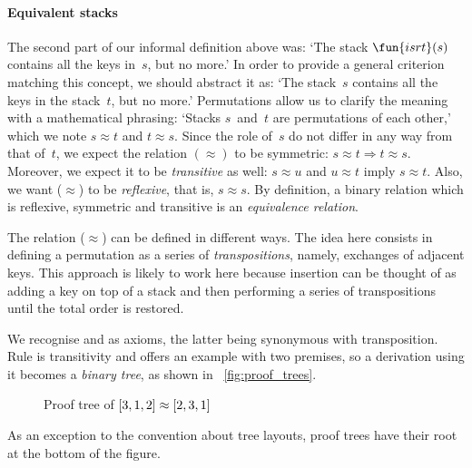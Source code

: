 \paragraph{Equivalent stacks}

The second part of our informal definition above was: `The stack
\(\fun{isrt}(s)\) contains all the keys
in~\(s\), but no more.'  In order to provide a general criterion
matching this concept, we should abstract it as: `The stack~\(s\)
contains all the keys in the stack~\(t\), but no more.' Permutations
allow us to clarify the meaning with a mathematical phrasing: `Stacks
\(s\)~and~\(t\) are permutations of each other,' which we note \(s
\approx t\) and \(t \approx s\). Since the role of~\(s\) do not differ
in any way from that of~\(t\), we expect the relation \((\approx)\) to
be symmetric: \(s \approx t \Rightarrow t \approx s\). Moreover, we
expect it to be \emph{transitive} as well: \(s \approx u\) and \(u
\approx t\) imply \(s \approx t\). Also, we want (\(\approx\)) to be
\emph{reflexive}, that is, \(s \approx s\). By definition, a binary
relation which is reflexive, symmetric and transitive is an
\emph{equivalence relation}.

The relation (\(\approx\)) can be defined in different ways. The idea
here consists in defining a permutation as a series of
\emph{transpositions}, namely, exchanges of
adjacent keys. This approach is likely to work here because insertion
can be thought of as adding a key on top of a stack and then
performing a series of transpositions until the total order is
restored.
We recognise  and  as axioms, the latter
being synonymous with transposition. Rule  is
transitivity and offers an example with two premises, so a derivation
using it becomes a \emph{binary tree}, as shown in
\fig~\vref{fig:proof_trees}.
\begin{figure}
\centering
{}
\qquad
{}
\caption{Proof tree of \({[}3,1,2{]} \protect\approx {[}2,3,1{]}\)}
\label{fig:proof_trees}
\end{figure}
As an exception to the convention about tree layouts, proof
trees have their root at the bottom of the
figure.

